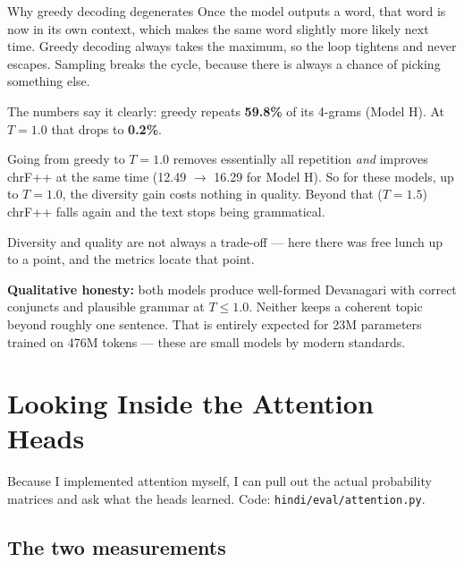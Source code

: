 \documentclass[11pt]{report}
\newcommand{\p}[1]{\texttt{#1}}
\begin{document}
\begin{concept}{Why greedy decoding degenerates}
Once the model outputs a word, that word is now in its own context, which makes
the same word slightly more likely next time. Greedy decoding always takes the
maximum, so the loop tightens and never escapes. Sampling breaks the cycle,
because there is always a chance of picking something else.

The numbers say it clearly: greedy repeats \textbf{59.8\%} of its 4-grams
(Model H). At $T=1.0$ that drops to \textbf{0.2\%}.
\end{concept}

\begin{notebox}
Going from greedy to $T=1.0$ removes essentially all repetition \emph{and}
improves chrF++ at the same time (12.49 $\to$ 16.29 for Model H). So for these
models, up to $T=1.0$, the diversity gain costs nothing in quality. Beyond that
($T=1.5$) chrF++ falls again and the text stops being grammatical.

Diversity and quality are not always a trade-off --- here there was free lunch up
to a point, and the metrics locate that point.
\end{notebox}

\textbf{Qualitative honesty:} both models produce well-formed Devanagari with
correct conjuncts and plausible grammar at $T \le 1.0$. Neither keeps a coherent
topic beyond roughly one sentence. That is entirely expected for 23M parameters
trained on 476M tokens --- these are small models by modern standards.


\chapter{Looking Inside the Attention Heads}
\label{ch:attn}

Because I implemented attention myself, I can pull out the actual probability
matrices and ask what the heads learned. Code: \p{hindi/eval/attention.py}.

\section{The two measurements}
\end{document}
